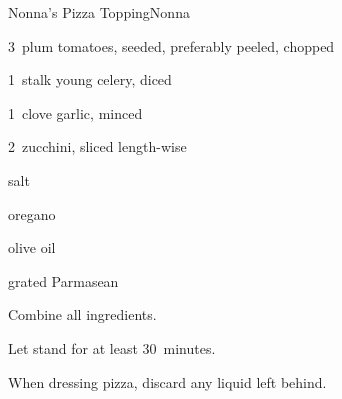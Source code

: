 \begin{recipe}{Nonna's Pizza Topping}{Nonna}{}

\begin{ingredients}
\item 3~plum tomatoes, seeded, preferably peeled, chopped
\item 1~stalk young celery, diced
\item 1~clove garlic, minced
\item 2~zucchini, sliced length-wise
\item salt
\item oregano
\item olive oil
\item grated Parmasean
\end{ingredients}

\begin{directions}
\item Combine all ingredients.
\item Let stand for at least 30~minutes.
\item When dressing pizza, discard any liquid left behind.
\end{directions}

\end{recipe}
